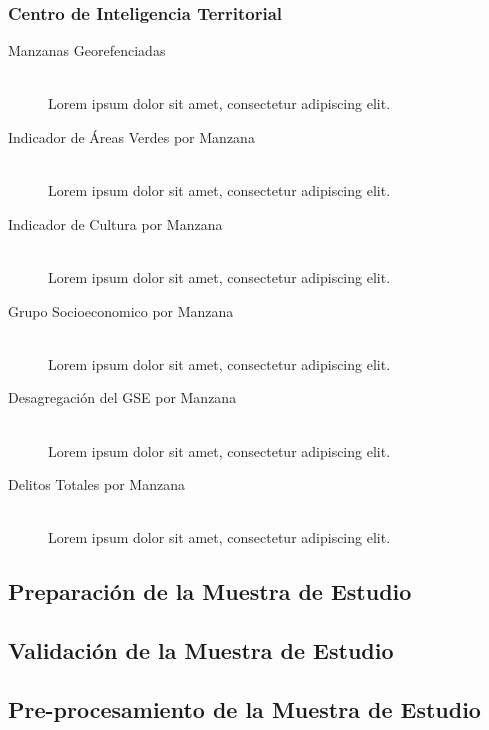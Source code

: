 \subsubsection{Centro de Inteligencia Territorial}
\begin{description}
  \item[Manzanas Georefenciadas] \hfill \\
     Lorem ipsum dolor sit amet, consectetur adipiscing elit. 
  \item[Indicador de Áreas Verdes por Manzana] \hfill \\
  
     Lorem ipsum dolor sit amet, consectetur adipiscing elit.
     
  \item[Indicador de Cultura por Manzana] \hfill \\
     Lorem ipsum dolor sit amet, consectetur adipiscing elit.
     
  \item[Grupo Socioeconomico por Manzana] \hfill \\
     Lorem ipsum dolor sit amet, consectetur adipiscing elit.
     
  \item[Desagregación del GSE por Manzana] \hfill \\
     Lorem ipsum dolor sit amet, consectetur adipiscing elit.

  \item[Delitos Totales por Manzana] \hfill \\
     Lorem ipsum dolor sit amet, consectetur adipiscing elit.
\end{description}
\subsection{Preparación de la Muestra de Estudio}
\subsection{Validación de la Muestra de Estudio}
\subsection{Pre-procesamiento de la Muestra de Estudio}




